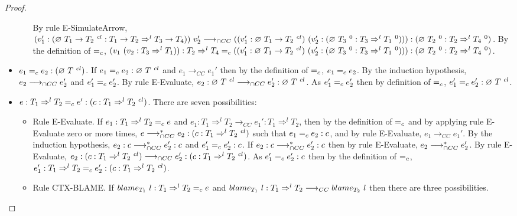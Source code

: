 \documentclass[a4paper]{article}
\begin{document}
\begin{proof}
\begin{itemize}
\begin{itemize}
        By rule E-SimulateArrow, $(v_1' : (\emptycast{T_1 \rightarrow T_2}{cl} : T_1 \rightarrow T_2 \Rightarrow^l T_3 \rightarrow T_4))\ v_2' \gios ((v_1' : \emptycast{T_1 \rightarrow T_2}{cl})\ (v_2' : (\emptycast{T_3}{0} : T_3 \Rightarrow^l T_1\ ^0))) : (\emptycast{T_2}{0} : T_2 \Rightarrow^l T_4\ ^0)$.
        By the definition of $=_c$, $(v_1\ (v_2 : T_3 \Rightarrow^l T_1)) : T_2 \Rightarrow^l T_4 =_c ((v_1' : \varnothing\ T_1 \rightarrow T_2\ ^{cl})\ (v_2' : (\varnothing\ T_3\ ^{0} : T_3 \Rightarrow^l T_1\ ^0))) : (\varnothing\ T_2\ ^{0} : T_2 \Rightarrow^l T_4\ ^0)$.
    \end{itemize}
    \item $e_1 =_c e_2 : (\varnothing\ T\ ^{cl})$.
    If $e_1 =_c e_2 : \varnothing\ T\ ^{cl}$ and $e_1 \longrightarrow_{CC} e_1'$ then by the definition of $=_c$, $e_1 =_c e_2$.
    By the induction hypothesis, $e_2 \longrightarrow_{\cap CC} e_2'$ and $e_1' =_c e_2'$.
    By rule E-Evaluate, $e_2 : \varnothing\ T\ ^{cl} \longrightarrow_{\cap CC} e_2' : \varnothing\ T\ ^{cl}$.
    As $e_1' =_c e_2'$ then by definition of $=_c$, $e_1' =_c e_2' : \varnothing\ T\ ^{cl}$.
    \item $e : T_1 \Rightarrow^l T_2 =_c e' : (c : T_1 \Rightarrow^l T_2\ ^{cl})$.
    There are seven possibilities:
    \begin{itemize}
        \item Rule E-Evaluate.
        If $e_1 : T_1 \Rightarrow^l T_2 =_c e$ and $e_1 : T_1 \Rightarrow^l T_2 \longrightarrow_{CC} e_1' : T_1 \Rightarrow^l T_2$, then by the definition of $=_c$ and by applying rule E-Evaluate zero or more times, $e \longrightarrow_{\cap CC}^* e_2 : (c : T_1 \Rightarrow^l T_2\ ^{cl})$ such that $e_1 =_c e_2 : c$, and by rule E-Evaluate, $e_1 \longrightarrow_{CC} e_1'$.
        By the induction hypothesis, $e_2 : c \longrightarrow_{\cap CC}^* e_2' : c$ and $e_1' =_c e_2' : c$.
        If $e_2 : c \longrightarrow_{\cap CC}^* e_2' : c$ then by rule E-Evaluate, $e_2 \longrightarrow_{\cap CC}^* e_2'$.
        By rule E-Evaluate, $e_2 : (c : T_1 \Rightarrow^l T_2\ ^{cl}) \longrightarrow_{\cap CC} e_2' : (c : T_1 \Rightarrow^l T_2\ ^{cl})$.
        As $e_1' =_c e_2' : c$ then by the definition of $=_c$, $e_1' : T_1 \Rightarrow^l T_2 =_c e_2' : (c : T_1 \Rightarrow^l T_2\ ^{cl})$.
        \item Rule CTX-BLAME.
        If $blame_{T_1}\ l : T_1 \Rightarrow^l T_2 =_c e$ and $blame_{T_1}\ l : T_1 \Rightarrow^l T_2 \longrightarrow_{CC} blame_{T_2}\ l$ then there are three possibilities.

\end{itemize}
\end{itemize}
\end{proof}
\end{document}
